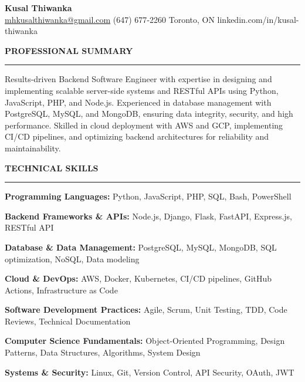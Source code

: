 \documentclass[10pt,letterpaper]{article}
\begin{document}
\begin{center}
{\LARGE\textbf{Kusal Thiwanka}}\\[3pt]
\href{mailto:mhkusalthiwanka@gmail.com}{mhkusalthiwanka@gmail.com}\hspace{2em}%
(647) 677{-}2260\hspace{2em}%
Toronto, ON\hspace{2em}
linkedin.com/in/kusal-thiwanka
\end{center}

\vspace{6pt}

\textbf{PROFESSIONAL SUMMARY}\\[-8pt]
\noindent\rule{\textwidth}{1pt}

\vspace{-2pt}

Results-driven Backend Software Engineer with expertise in designing and implementing scalable server-side systems and RESTful APIs using Python, JavaScript, PHP, and Node.js. Experienced in database management with PostgreSQL, MySQL, and MongoDB, ensuring data integrity, security, and high performance. Skilled in cloud deployment with AWS and GCP, implementing CI/CD pipelines, and optimizing backend architectures for reliability and maintainability.

\vspace{8pt}

\textbf{TECHNICAL SKILLS}\\[-8pt]
\noindent\rule{\textwidth}{1pt}

\vspace{-2pt}

\textbf{Programming Languages:} Python, JavaScript, PHP, SQL, Bash, PowerShell

\textbf{Backend Frameworks \& APIs:} Node.js, Django, Flask, FastAPI, Express.js, RESTful API

\textbf{Database \& Data Management:} PostgreSQL, MySQL, MongoDB, SQL optimization, NoSQL, Data modeling

\textbf{Cloud \& DevOps:} AWS, Docker, Kubernetes, CI/CD pipelines, GitHub Actions, Infrastructure as Code

\textbf{Software Development Practices:} Agile, Scrum, Unit Testing, TDD, Code Reviews, Technical Documentation

\textbf{Computer Science Fundamentals:} Object-Oriented Programming, Design Patterns, Data Structures, Algorithms, System Design

\textbf{Systems \& Security:} Linux, Git, Version Control, API Security, OAuth, JWT
\end{document}
